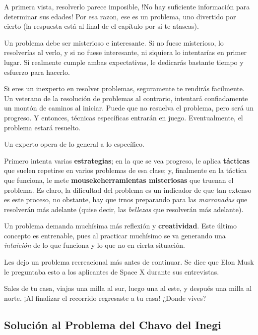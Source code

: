 A primera vista, resolverlo parece imposible, 
!No hay suficiente información para determinar sus edades!
Por esa razon, ese es un problema, uno divertido por cierto 
(la respuesta está al final de el capítulo por si te atascas).

Un problema debe ser misterioso e interesante. Si no fuese misterioso, 
lo resolverías al verlo, y si no fuese interesante, ni siquiera lo 
intentarías en primer lugar. Si realmente cumple ambas expectativas, 
le dedicarás bastante tiempo y esfuerzo para hacerlo.

Si eres un inexperto en resolver problemas, seguramente te rendirás 
facilmente. Un veterano de la resolución de problemas al contrario, 
intentará confiadamente un montón de caminos al iniciar. Puede que no 
resuelva el problema, pero será un progreso. Y entonces, 
técnicas específicas entrarán en juego. Eventualmente, 
el problema estará resuelto. 

\begin{moral}
    Un experto opera de lo general a lo específico. 
\end{moral}

Primero intenta varias \textbf{estrategias}; en la que se vea progreso, 
le aplica \textbf{tácticas} que suelen repetirse en varios problemas 
de esa clase; y, finalmente en la táctica que funciona,  
le mete \textbf{mousekeherramientas 
misteriosas} que truenan el problema. Es claro, la dificultad del problema 
es un indicador de que tan extenso es este proceso, no obstante, hay 
que irnos preparando para las \textit{marranadas} que resolverán más adelante 
(quise decir, las \textit{bellezas} que resolverán más adelante).

Un problema demanda muchísima más reflexión y \textbf{creatividad}. 
Este último concepto es entrenable, 
pues al practicar muchísimo se va generando una \textit{intuición} 
de lo que funciona y lo que no en cierta situación.  

Les dejo un problema recreacional más antes de continuar. 
Se dice que Elon Musk le preguntaba esto a los aplicantes de Space X 
durante sus entrevistas.

\begin{problem}
    \jp
    Sales de tu casa, viajas una milla al sur, luego una al este, 
    y después una milla al norte. 
    ¡Al finalizar el recorrido regresaste a tu casa! ¿Donde vives?
\end{problem}

\subsection{Solución al Problema del Chavo del Inegi}

